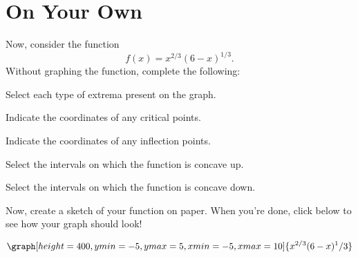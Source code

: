 \documentclass{ximera}
\begin{document}
\section{On Your Own}
\begin{question}
Now, consider the function $$f(x)=x^{2/3}(6-x)^{1/3}\text{.}$$ Without graphing the function, complete the following:

Select each type of extrema present on the graph.
\begin{selectAll}
\end{selectAll}

Indicate the coordinates of any critical points.
\begin{selectAll}
\end{selectAll}

Indicate the coordinates of any inflection points.
\begin{selectAll}
\end{selectAll}

Select the intervals on which the function is concave up.
\begin{selectAll}
\end{selectAll}

Select the intervals on which the function is concave down.

\begin{selectAll}
\end{selectAll}


Now, create a sketch of your function on paper. When you're done, click below to see how your graph should look!

\begin{multipleChoice}
\end{multipleChoice}
\begin{feedback}[correct]
\[
\graph[height=400,ymin=-5,ymax=5,xmin=-5,xmax=10]{x^{2/3}(6-x)^1/3}
\]
\end{feedback}
\end{question}
\end{document}
